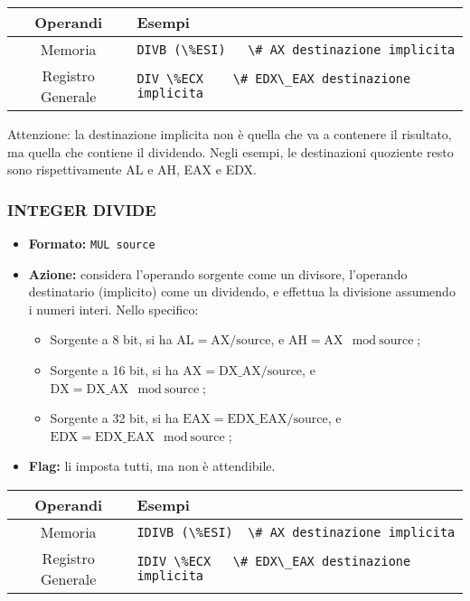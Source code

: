 \documentclass[a4paper,11pt]{article}
\begin{document}
		\begin{table}[H]
		\center {}
			\begin{tabular} { c | p{10cm} }
				\bfseries Operandi & \bfseries Esempi \\
				\hline
				Memoria & \lstinline!DIVB (\%ESI)	\# AX destinazione implicita! \\ 
				Registro Generale & \lstinline|DIV \%ECX	\# EDX\_EAX destinazione implicita|
			\end{tabular}
		\end{table}

Attenzione: la destinazione implicita non è quella che va a contenere il risultato, ma quella che contiene il dividendo.
Negli esempi, le destinazioni quoziente resto sono rispettivamente AL e AH, EAX e EDX.

\subsubsection{INTEGER DIVIDE}
\begin{itemize}
	\item \textbf{Formato:} \lstinline|MUL source|
	\item \textbf{Azione:} considera l'operando sorgente come un divisore, l'operando destinatario (implicito) come un dividendo, e effettua la divisione assumendo i numeri interi. Nello specifico:
	\begin{itemize}
	\item Sorgente a 8 bit, si ha $\text{AL} = \text{AX} / \text{source}$, e $ \text{AH} = \text{AX} \mod \text{source} $;
	\item Sorgente a 16 bit, si ha $\text{AX} = \text{DX\_AX} / \text{source}$, e $ \text{DX} = \text{DX\_AX} \mod \text{source} $;
	\item Sorgente a 32 bit, si ha $\text{EAX} = \text{EDX\_EAX} / \text{source}$, e $ \text{EDX} = \text{EDX\_EAX} \mod \text{source} $;
	\end{itemize}
	\item \textbf{Flag:} li imposta tutti, ma non è attendibile.
\end{itemize}

		\begin{table}[H]
		\center {}
			\begin{tabular} { c | p{10cm} }
				\bfseries Operandi & \bfseries Esempi \\
				\hline
				Memoria & \lstinline|IDIVB (\%ESI)	\# AX destinazione implicita| \\ 
				Registro Generale & \lstinline|IDIV \%ECX	\# EDX\_EAX destinazione implicita|
			\end{tabular}
		\end{table}
\end{document}
